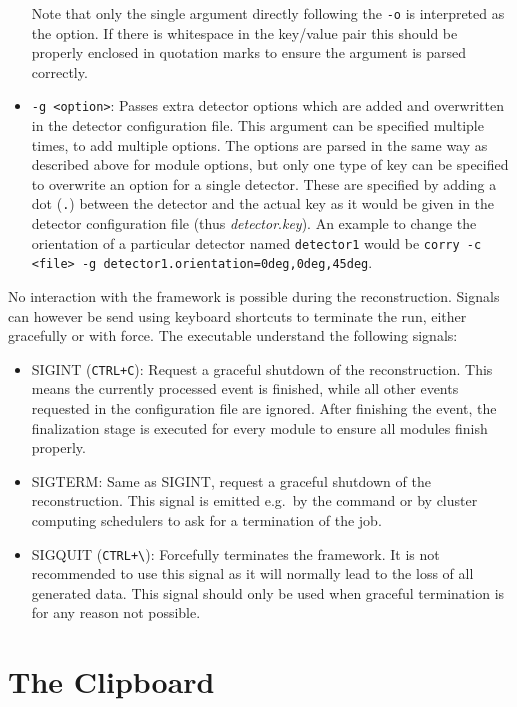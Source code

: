 \begin{itemize}
\begin{itemize}
\end{itemize}
Note that only the single argument directly following the \texttt{-o} is interpreted as the option. If there is whitespace in the key/value pair this should be properly enclosed in quotation marks to ensure the argument is parsed correctly.
\item \texttt{-g <option>}: Passes extra detector options which are added and overwritten in the detector configuration file.
This argument can be specified multiple times, to add multiple options.
The options are parsed in the same way as described above for module options, but only one type of key can be specified to overwrite an option for a single detector.
These are specified by adding a dot (\texttt{.}) between the detector and the actual key as it would be given in the detector configuration file (thus \textit{detector}.\textit{key}). An example to change the orientation of a particular detector named \texttt{detector1} would be \texttt{corry -c <file> -g detector1.orientation=0deg,0deg,45deg}.
\end{itemize}

No interaction with the framework is possible during the reconstruction. Signals can however be send using keyboard shortcuts to terminate the run, either gracefully or with force. The executable understand the following signals:
\begin{itemize}
\item SIGINT (\texttt{CTRL+C}): Request a graceful shutdown of the reconstruction. This means the currently processed event is finished, while all other events requested in the configuration file are ignored. After finishing the event, the finalization stage is executed for every module to ensure all modules finish properly.
\item SIGTERM: Same as SIGINT, request a graceful shutdown of the reconstruction. This signal is emitted e.g.\ by the  command or by cluster computing schedulers to ask for a termination of the job.
\item SIGQUIT (\texttt{CTRL+\textbackslash}): Forcefully terminates the framework. It is not recommended to use this signal as it will normally lead to the loss of all generated data. This signal should only be used when graceful termination is for any reason not possible.
\end{itemize}

\section{The Clipboard}

